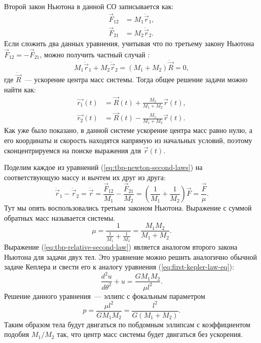 Второй закон Ньютона в данной СО записывается как:
\begin{equation}
\begin{aligned}
	\vec{F}_{12} &= M_1 \ddot{\vec{r}}_1,\\
	\vec{F}_{21} &= M_2 \ddot{\vec{r}}_2.
\end{aligned}
\label{eq:tbp-newton-second-laws}
\end{equation}
Если сложить два данных уравнения, учитывая что по третьему закону Ньютона $\vec{F}_{12} = -\vec{F}_{21}$, можно получить частный случай :
\begin{equation*}
	M_1 \ddot{\vec{r}}_1 + M_2 \ddot{\vec{r}}_2 = (M_1 + M_2) \ddot{\vec{R}} = 0,
\end{equation*}
где $\ddot{\vec{R}}$~--- ускорение центра масс системы. Тогда общее решение задачи можно найти как:
\begin{equation}
\begin{aligned}
	\vec{r_1}(t) &= \vec{R}(t) + \frac{M_2}{M_1 + M_2} \vec{r}(t), \\
	\vec{r_2}(t) &= \vec{R}(t) - \frac{M_1}{M_1 + M_2} \vec{r}(t).
\end{aligned}
\end{equation}
Как уже было показано, в данной системе ускорение центра масс равно нулю, а его координаты и скорость находятся напрямую из начальных условий, поэтому сконцентрируемся на поиске выражения для $\vec{r}(t)$.

Поделим каждое из уравнений (\ref{eq:tbp-newton-second-laws}) на соответствующую массу и вычтем их друг из друга:
\begin{equation}
	\ddot{\vec{r}}_1 - \ddot{\vec{r}}_2 = \ddot{\vec{r}} = \frac{\vec{F}_{12}}{M_1}-\frac{\vec{F}_{21}}{M_2} = \left(\frac{1}{M_1}+\frac{1}{M_2}\right) \vec{F} = \frac{\vec{F}}{\mu}.
	\label{eq:tbp-relative-second-law}
\end{equation}
Тут мы опять воспользовались третьим законом Ньютона. Выражение с суммой обратных масс называется  системы.
\begin{equation}
	\mu = \frac{1}{\frac{1}{M_1} + \frac{1}{M_2}} = \frac{M_1 M_2}{M_1 + M_2}.
\end{equation}
Выражение (\ref{eq:tbp-relative-second-law}) является аналогом второго закона Ньютона для задачи двух тел. Это уравнение можно решить аналогично обычной задаче Кеплера и свести его к аналогу уравнения (\ref{eq:first-kepler-law-eq}):
\begin{equation}
	\frac{d^2 u}{d \theta^2} + u = \frac{GM_1 M_2}{\mu l^2}.
\end{equation}
Решение данного уравнения~--- эллипс с фокальным параметром
\begin{equation*}
	p = \frac{\mu l^2}{GM_1 M_2} = \frac{l^2}{G(M_1 + M_2)}.
\end{equation*}
Таким образом тела будут двигаться по побдомным эллипсам с коэффициентом подобия $M_1/M_2$ так, что центр масс системы будет двигаться без ускорения.

